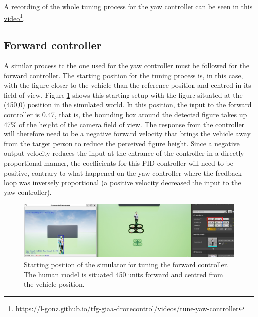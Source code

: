 A recording of the whole tuning process for the yaw controller can be seen in this \href{https://l-gonz.github.io/tfg-giaa-dronecontrol/videos/tune-yaw-controller}{video}\footnote{\url{https://l-gonz.github.io/tfg-giaa-dronecontrol/videos/tune-yaw-controller}}.


\subsection{Forward controller}


A similar process to the one used for the yaw controller must be followed for the forward controller.
The starting position for the tuning process is, in this case, with the figure closer to the vehicle than the reference position and centred in its field of view.
Figure \ref{fig:tune-ref-pos-fwd} shows this starting setup with the figure situated at the (450,0) position in the simulated world.
In this position, the input to the forward controller is 0.47, that is, the bounding box around the detected figure takes up 47\% of the height of the camera field of view.
The response from the controller will therefore need to be a negative forward velocity that brings the vehicle away from the target person to reduce the perceived figure height.
Since a negative output velocity reduces the input at the entrance of the controller in a directly proportional manner, the coefficients for this PID controller will need to be positive, contrary to what happened on the yaw controller where the feedback loop was inversely proportional (a positive velocity decreased the input to the yaw controller).


\begin{figure}
  \centering
  \includegraphics[width=\textwidth, keepaspectratio]{img/pid/tune-ref-pos-fwd.jpg}
  \caption{Starting position of the simulator for tuning the forward controller. The human model is situated 450 units forward and centred from the vehicle position.}\label{fig:tune-ref-pos-fwd}
\end{figure}

